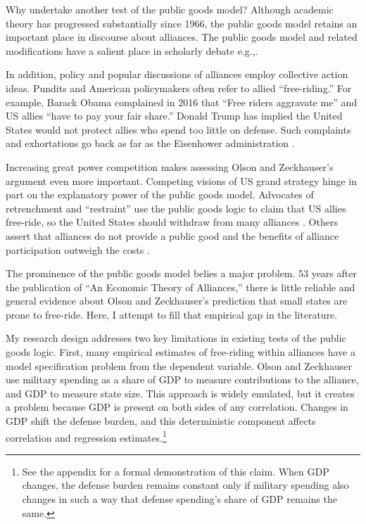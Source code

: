 \documentclass[12pt]{article}
\begin{document}
Why undertake another test of the public goods model? 
Although academic theory has progressed substantially since 1966, the public goods model retains an important place in discourse about alliances.
The public goods model and related modifications \citep{Sandler1993} have a salient place in scholarly debate e.g.,\citep{Walt1990, Mearsheimer1994, Goldstein1995, SandlerHartley2001, Garfinkel2004, Walt2009, Norrlof2010, Barrett2010, PluemperNeumayer2015}.


In addition, policy and popular discussions of alliances employ collective action ideas.
Pundits and American policymakers often refer to allied ``free-riding.'' 
For example, Barack Obama complained in 2016 that ``Free riders aggravate me'' and US allies ``have to pay your fair share.'' 
Donald Trump has implied the United States would not protect allies who spend too little on defense. 
Such complaints and exhortations go back as far as the Eisenhower administration \citep{Lanoszka2015}.


Increasing great power competition makes assessing Olson and Zeckhauser's argument even more important. 
Competing visions of US grand strategy hinge in part on the explanatory power of the public goods model. 
Advocates of retrenchment and ``restraint'' use the public goods logic to claim that US allies free-ride, so the United States should withdraw from many alliances \citep{Preble2009, Posen2014}. 
Others assert that alliances do not provide a public good and the benefits of alliance participation outweigh the costs \citep{Brooksetal2013, BrandsFeaver2017}. 


The prominence of the public goods model belies a major problem.
53 years after the publication of ``An Economic Theory of Alliances,'' there is little reliable and general evidence about Olson and Zeckhauser's prediction that small states are prone to free-ride. 
Here, I attempt to fill that empirical gap in the literature. 


My research design addresses two key limitations in existing tests of the public goods logic.
First, many empirical estimates of free-riding within alliances have a model specification problem from the dependent variable.
Olson and Zeckhauser use military spending as a share of GDP to measure contributions to the alliance, and GDP to measure state size.
This approach is widely emulated, but it creates a problem because GDP is present on both sides of any correlation.
Changes in GDP shift the defense burden, and this deterministic component affects correlation and regression estimates.\footnote{
See the appendix for a formal demonstration of this claim. 
When GDP changes, the defense burden remains constant only if military spending also changes in such a way that defense spending's share of GDP remains the same.}  
\end{document}
